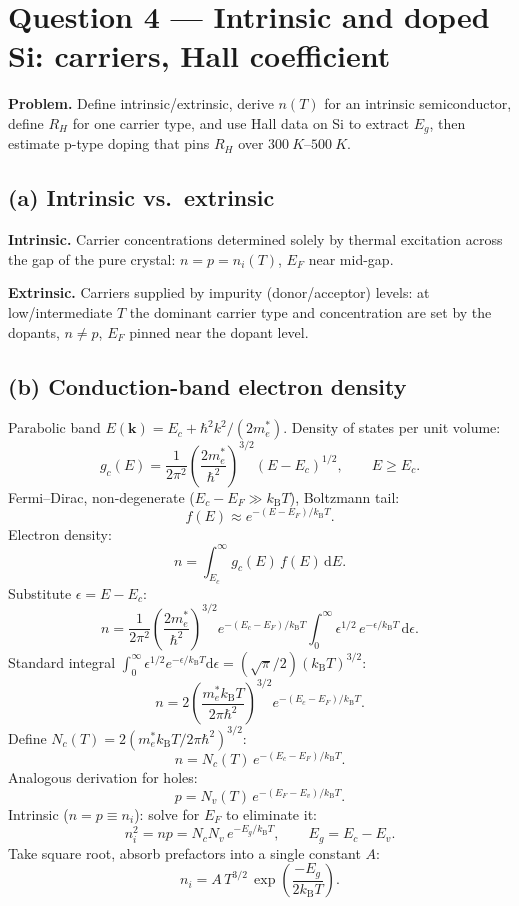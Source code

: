 \documentclass[11pt]{article}
\newcommand{\de}{\mathrm{d}}
\newcommand{\kB}{k_{\mathrm{B}}}
\begin{document}
\section*{Question 4 --- Intrinsic and doped Si: carriers, Hall coefficient}

\textbf{Problem.} Define intrinsic/extrinsic, derive $n(T)$ for an intrinsic semiconductor, define $R_{H}$ for one carrier type, and use Hall data on Si to extract $E_{g}$, then estimate p-type doping that pins $R_{H}$ over $\SI{300}{K}$--$\SI{500}{K}$.

\subsection*{(a) Intrinsic vs.\ extrinsic}

\textbf{Intrinsic.} Carrier concentrations determined solely by thermal excitation across the gap of the pure crystal: $n=p=n_{i}(T)$, $E_{F}$ near mid-gap.

\textbf{Extrinsic.} Carriers supplied by impurity (donor/acceptor) levels: at low/intermediate $T$ the dominant carrier type and concentration are set by the dopants, $n\neq p$, $E_{F}$ pinned near the dopant level.

\subsection*{(b) Conduction-band electron density}

Parabolic band $E(\mathbf k) = E_{c}+\hbar^{2}k^{2}/(2 m_{e}^{*})$. Density of states per unit volume:
\[
g_{c}(E) = \frac{1}{2\pi^{2}}\!\left(\frac{2 m_{e}^{*}}{\hbar^{2}}\right)^{\!3/2}\!(E-E_{c})^{1/2},\qquad E\ge E_{c}.
\]
Fermi--Dirac, non-degenerate ($E_{c}-E_{F}\gg\kB T$), Boltzmann tail:
\[
f(E) \approx e^{-(E-E_{F})/\kB T}.
\]
Electron density:
\[
n = \int_{E_{c}}^{\infty}\!g_{c}(E)\,f(E)\,\de E.
\]
Substitute $\epsilon = E-E_{c}$:
\[
n = \frac{1}{2\pi^{2}}\!\left(\frac{2 m_{e}^{*}}{\hbar^{2}}\right)^{\!3/2}\!e^{-(E_{c}-E_{F})/\kB T}\!\int_{0}^{\infty}\!\epsilon^{1/2}\,e^{-\epsilon/\kB T}\,\de\epsilon.
\]
Standard integral $\int_{0}^{\infty}\!\epsilon^{1/2}e^{-\epsilon/\kB T}\de\epsilon = (\sqrt{\pi}/2)(\kB T)^{3/2}$:
\[
n = 2\!\left(\frac{m_{e}^{*}\kB T}{2\pi\hbar^{2}}\right)^{\!3/2}\!e^{-(E_{c}-E_{F})/\kB T}.
\]
Define $N_{c}(T) = 2(m_{e}^{*}\kB T/2\pi\hbar^{2})^{3/2}$:
\[
n = N_{c}(T)\,e^{-(E_{c}-E_{F})/\kB T}.
\]
Analogous derivation for holes:
\[
p = N_{v}(T)\,e^{-(E_{F}-E_{v})/\kB T}.
\]
Intrinsic ($n=p\equiv n_{i}$): solve for $E_{F}$ to eliminate it:
\[
n_{i}^{2} = n p = N_{c}N_{v}\,e^{-E_{g}/\kB T},\qquad E_{g}=E_{c}-E_{v}.
\]
Take square root, absorb prefactors into a single constant $A$:
\[
\boxed{\;n_{i} = A\,T^{3/2}\,\exp\!\left(\frac{-E_{g}}{2\kB T}\right).\;}
\]
\end{document}
